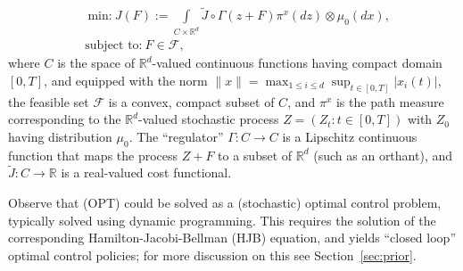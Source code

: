 \documentclass[11pt,leqno]{amsart}
\begin{document}
\begin{align*}\label{opt}
\tag{OPT}
 &~\text{min:}~J(F) := \underset{C \times \mathbb R^d}\int \tilde J\circ\Gamma(z+F)\pi^x(dz) \otimes \mu_0(dx),\\
\nonumber&\text{subject to:}~
F \in \mathcal F,
\end{align*}
where $C$ is the space of $\mathbb{R}^d$-valued continuous functions having compact domain $[0,T]$, and equipped with the norm $\|x\| = \max_{1 \leq i \leq d} \sup_{t \in [0,T]} |x_i(t)|$, the feasible set $\mathcal F$ is a convex, compact subset of $C$, and $\pi^x$ is the path measure corresponding to the $\mathbb{R}^d$-valued stochastic process $Z = (Z_t : t \in [0,T])$ with $Z_0$ having distribution $\mu_0$.  The ``regulator'' $\Gamma : C \to C$ is a Lipschitz continuous function that maps the process $Z + F$ to a subset of $\mathbb{R}^d$ (such as an orthant), and $\tilde J : C \to \mathbb R$ is a real-valued cost functional. 


Observe that (OPT) could be solved as a (stochastic) optimal control problem, typically solved using dynamic programming. This requires the solution of the corresponding Hamilton-Jacobi-Bellman (HJB) equation, and yields ``closed loop'' optimal control policies; for more discussion on this see Section~\ref{sec:prior}.
\end{document}
